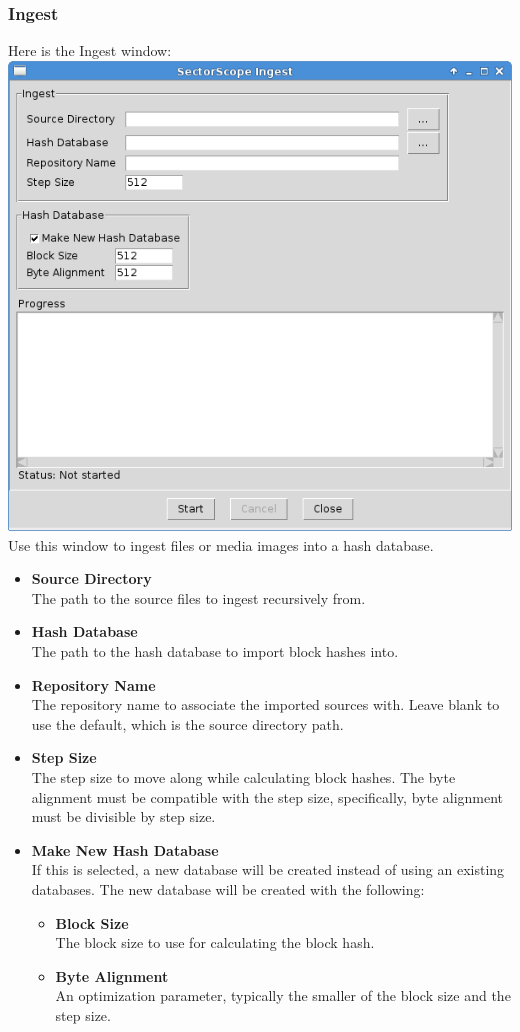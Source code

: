 \documentclass[11pt,fleqn]{article} %
\begin{document}
\subsubsection{Ingest}
Here is the \sscope Ingest window:\\
\includegraphics[scale=.4]{screenshots/ingest}\\
Use this window to ingest files or media images into a hash database.
\begin{itemize}
\item \textbf{Source Directory}\\
The path to the source files to ingest recursively from.
\item \textbf{Hash Database}\\
The path to the hash database to import block hashes into.
\item \textbf{Repository Name}\\
The repository name to associate the imported sources with. Leave blank to use the default, which is the source directory path.
\item \textbf{Step Size}\\
The step size to move along while calculating block hashes. The byte alignment must be compatible with the step size, specifically, byte alignment must be divisible by step size.
\item \textbf{Make New Hash Database}\\
If this is selected, a new database will be created instead of using an existing databases. The new database will be created with the following:
  \begin{itemize}
  \item \textbf{Block Size}\\
  The block size to use for calculating the block hash.
  \item \textbf{Byte Alignment}\\
  An optimization parameter, typically the smaller of the block size and the step size.
  \end{itemize}
\end{itemize}
\end{document}
